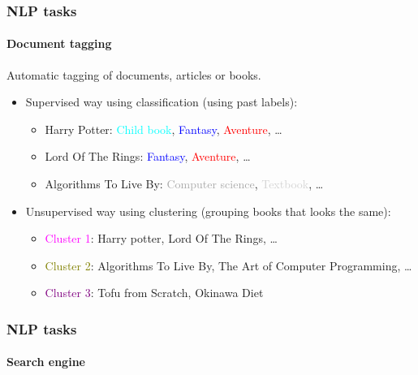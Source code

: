 \documentclass[9pt]{beamer}
\begin{document}
\begin{frame}
  \frametitle{NLP tasks}

  \framesubtitle{Document tagging}

  Automatic tagging of documents, articles or books.

  \bigskip

  \begin{itemize}
  \item Supervised way using classification (using past labels):
    \begin{itemize}
    \item Harry Potter: \textcolor{cyan}{Child book}, \textcolor{blue}{Fantasy},
      \textcolor{red}{Aventure}, \dots
    \item Lord Of The Rings: \textcolor{blue}{Fantasy},
      \textcolor{red}{Aventure}, \dots
    \item Algorithms To Live By: \textcolor{darkgray}{Computer
      science}, \textcolor{lightgray}{Textbook}, \dots
    \end{itemize}

    \bigskip

  \item Unsupervised way using clustering (grouping books that looks the same):
    \begin{itemize}
    \item \textcolor{magenta}{Cluster 1}: Harry potter, Lord Of The
      Rings, \dots
    \item \textcolor{olive}{Cluster 2}: Algorithms To Live By, The Art
      of Computer Programming, \dots
    \item \textcolor{purple}{Cluster 3}: Tofu from Scratch, Okinawa
      Diet
    \end{itemize}
  \end{itemize}
\end{frame}

\begin{frame}
  \frametitle{NLP tasks}

  \framesubtitle{Search engine}
\end{frame}
\end{document}
